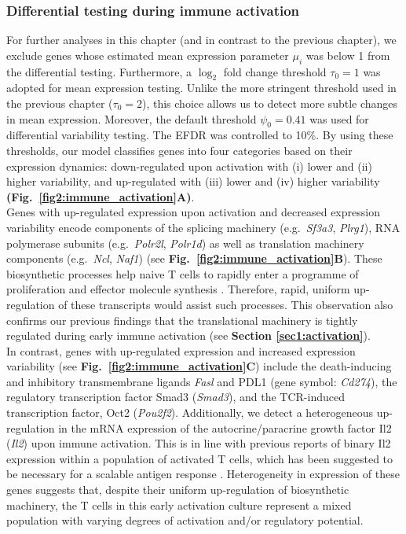 \subsubsection{Differential testing during immune activation}

For further analyses in this chapter (and in contrast to the previous chapter), we exclude genes whose estimated mean expression parameter $\mu_i$ was below 1 from the differential testing. Furthermore, a $\log_2$ fold change threshold $\tau_0 = 1$ was adopted for mean expression testing. Unlike the more stringent threshold used in the previous chapter ($\tau_0 = 2$), this choice allows us to detect more subtle changes in mean expression. Moreover, the default threshold $\psi_0 = 0.41$ was used for differential variability testing. The EFDR was controlled to 10\%. By using these thresholds, our model classifies genes into four categories based on their expression dynamics: down-regulated upon activation with (i) lower and (ii) higher variability, and up-regulated with (iii) lower and (iv) higher variability \textbf{(Fig.~\ref{fig2:immune_activation}A)}. \\

Genes with up-regulated expression upon activation and decreased expression variability encode components of the splicing machinery (e.g.~\textit{Sf3a3}, \textit{Plrg1}), RNA polymerase subunits (e.g.~\textit{Polr2l}, \textit{Polr1d}) as well as translation machinery components (e.g.~\textit{Ncl}, \textit{Naf1}) (see \textbf{Fig.~\ref{fig2:immune_activation}B}). These biosynthetic processes help naive T cells to rapidly enter a programme of proliferation and effector molecule synthesis \citep{Tan2017,Araki2017}. Therefore, rapid, uniform up-regulation of these transcripts would assist such processes. This observation also confirms our previous findings that the translational machinery is tightly regulated during early immune activation (see \textbf{Section \ref{sec1:activation}}).\\

In contrast, genes with up-regulated expression and increased expression variability (see \textbf{Fig.~\ref{fig2:immune_activation}C}) include the death-inducing and inhibitory transmembrane ligands \textit{\gls{Fasl}} and \gls{PDL1} (gene symbol: \textit{Cd274}), the regulatory transcription factor Smad3 (\textit{Smad3}), and the TCR-induced transcription factor, Oct2 (\textit{Pou2f2}). Additionally, we detect a heterogeneous up-regulation in the mRNA expression of the autocrine/paracrine growth factor Il2 (\textit{Il2}) upon immune activation. This is in line with previous reports of binary Il2 expression within a population of activated T cells, which has been suggested to be necessary for a scalable antigen response \citep{Fuhrmann2016}. Heterogeneity in expression of these genes suggests that, despite their uniform up-regulation of biosynthetic machinery, the T cells in this early activation culture represent a mixed population with varying degrees of activation and/or regulatory potential. \\

